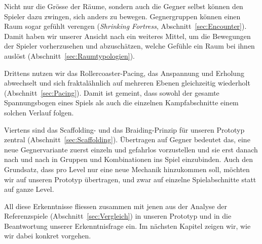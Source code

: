 \documentclass[../Main.tex]{subfiles}
\begin{document}
Nicht nur die Grösse der Räume, sondern auch die Gegner selbst können den Spieler dazu zwingen, sich anders zu bewegen. Gegnergruppen können einen Raum sogar gefühlt verengen (\textit{Shrinking Fortress}, Abschnitt~\ref{sec:Encounter}). Damit haben wir unserer Ansicht nach ein weiteres Mittel, um die Bewegungen der Spieler vorherzusehen und abzuschätzen, welche Gefühle ein Raum bei ihnen auslöst (Abschnitt~\ref{sec:Raumtypologien}).

Drittens nutzen wir das Rollercoaster-Pacing, das Anspannung und Erholung abwechselt und sich fraktalähnlich auf mehreren Ebenen gleichzeitig wiederholt (Abschnitt~\ref{sec:Pacing}). Damit ist gemeint, dass sowohl der gesamte Spannungsbogen eines Spiels als auch die einzelnen Kampfabschnitte einem solchen Verlauf folgen.

Viertens sind das Scaffolding- und das Braiding-Prinzip für unseren Prototyp zentral (Abschnitt~\ref{sec:Scaffolding}). Übertragen auf Gegner bedeutet das, eine neue Gegnervariante zuerst einzeln und gefahrlos vorzustellen und sie erst danach nach und nach in Gruppen und Kombinationen ins Spiel einzubinden. Auch den Grundsatz, dass pro Level nur eine neue Mechanik hinzukommen soll, möchten wir auf unseren Prototyp übertragen, und zwar auf einzelne Spielabschnitte statt auf ganze Level.

All diese Erkenntnisse fliessen zusammen mit jenen aus der Analyse der Referenzspiele (Abschnitt~\ref{sec:Vergleich}) in unseren Prototyp und in die Beantwortung unserer Erkenntnisfrage ein. Im nächsten Kapitel zeigen wir, wie wir dabei konkret vorgehen.
\end{document}
